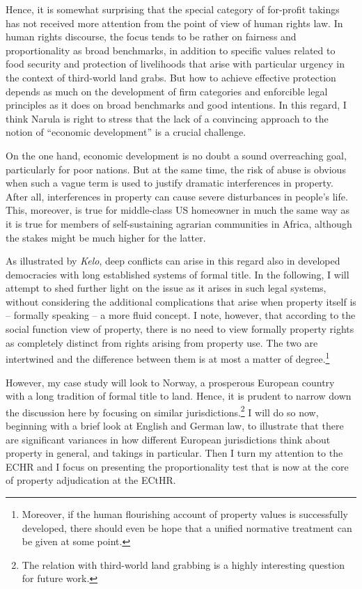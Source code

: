 Hence, it is somewhat surprising that the special category of for-profit takings has not received more attention from the point of view of human rights law. In human rights discourse, the focus tends to be rather on fairness and proportionality as broad benchmarks, in addition to specific values related to food security and protection of livelihoods that arise with particular urgency in the context of third-world land grabs. But how to achieve effective protection depends as much on the development of firm categories and enforcible legal principles as it does on broad benchmarks and good intentions. In this regard, I think Narula is right to stress that the lack of a convincing approach to the notion of ``economic development'' is a crucial challenge.

On the one hand, economic development is no doubt a sound overreaching goal, particularly for poor nations. But at the same time, the risk of abuse is obvious when such a vague term is used to justify dramatic interferences in property. After all, interferences in property can cause severe disturbances in people's life. This, moreover, is true for middle-class US homeowner in much the same way as it is true for members of self-sustaining agrarian communities in Africa, although the stakes might be much higher for the latter.

As illustrated by {\it Kelo}, deep conflicts can arise in this regard also in developed democracies with long established systems of formal title. In the following, I will attempt to shed further light on the issue as it arises in such legal systems, without considering the additional complications that arise when property itself is -- formally speaking -- a more fluid concept. I note, however, that according to the social function view of property, there is no need to view formally  property rights as completely distinct from rights arising from property use. The two are intertwined and the difference between them is at most a matter of degree.\footnote{Moreover, if the human flourishing account of property values is successfully developed, there should even be hope that a unified normative treatment can be given at some point.}

However, my case study will look to Norway, a prosperous European country with a long tradition of formal title to land. Hence, it is prudent to narrow down the discussion here by focusing on similar jurisdictions.\footnote{The relation with third-world land grabbing is a highly interesting question for future work.} I will do so now, beginning with a brief look at English and German law, to illustrate that there are significant variances in how different European jurisdictions think about property in general, and takings in particular. Then I turn my attention to the ECHR and I focus on presenting the proportionality test that is now at the core of property adjudication at the ECtHR.

